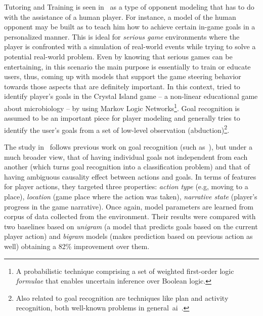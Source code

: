 Tutoring and Training is seen in~\cite{herik_opponent_2005} as a type of opponent modeling that has to do with the assistance of a human player. For instance, a model of the human opponent may be built as to teach him how to achieve certain in-game goals in a personalized manner. This is ideal for \textit{serious game} environments where the player is confronted with a simulation of real-world events while trying to solve a potential real-world problem. Even by knowing that serious games can be entertaining, in this scenario the main purpose is essentially to train or educate users, thus, coming up with models that support the game steering behavior towards those aspects that are definitely important. In this context, \cite{ha_goal_2011} tried to identify player's goals in the Crystal Island game -- a non-linear educational game about microbiology -- by using Markov Logic Networks\footnote{A probabilistic technique comprising a set of weighted first-order logic \textit{formulae} that enables uncertain inference over Boolean logic. }. Goal recognition is assumed to be an important piece for player modeling and generally tries to identify the user's goals from a set of low-level observation (abduction)\footnote{Also related to goal recognition are techniques like plan and activity recognition, both well-known problems in general~\gls{ai}~\cite{ha_goal_2011}.}. 

The study in~\cite{ha_goal_2011} follows previous work on goal recognition (such as~\cite{mott_probabilistic_2006}), but under a much broader view, that of having individual goals not independent from each another (which turns goal recognition into a classification problem) and that of having ambiguous causality effect between actions and goals. In terms of features for player actions, they targeted three properties: \textit{action type} (e.g, moving to a place), \textit{location} (game place where the action was taken), \textit{narrative state} (player's progress in the game narrative).  Once again, model parameters are learned from corpus of data collected from the environment. Their results were compared with two baselines based on \textit{unigram} (a model that predicts goals based on the current player action) and \textit{bigram} models (makes prediction based on previous action as well) obtaining a 82\% improvement over them.

